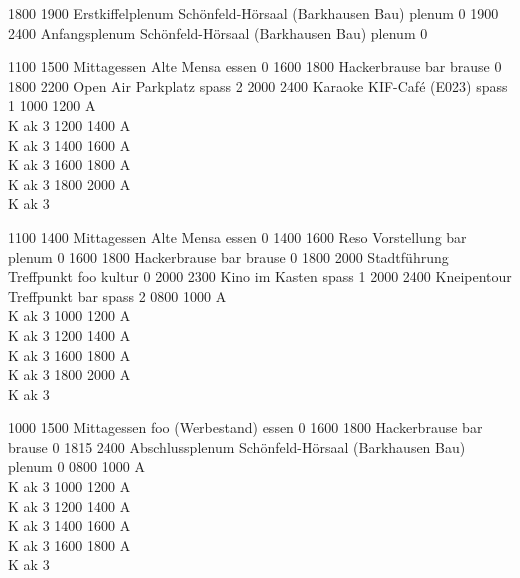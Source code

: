 \documentclass[a5paper,9pt]{scrreprt}
\begin{document}
\begin{timetable}
   {1800} {1900} {Erstkiffelplenum} {Schönfeld-Hörsaal (Barkhausen Bau)} {} {plenum}  {0}
   {1900} {2400} {Anfangsplenum}    {Schönfeld-Hörsaal (Barkhausen Bau)} {} {plenum}  {0}

   {1100} {1500} {Mittagessen}      {Alte Mensa}       {} {essen}   {0}
   {1600} {1800} {Hackerbrause}     {bar}              {} {brause}  {0}
   {1800} {2200} {Open Air}         {Parkplatz}        {} {spass}   {2}
   {2000} {2400} {Karaoke}          {KIF-Café (E023)}  {} {spass}   {1}
   {1000} {1200} {\hfill A\\ \hfill K} {}              {} {ak}      {3}
   {1200} {1400} {\hfill A\\ \hfill K} {}              {} {ak}      {3}
   {1400} {1600} {\hfill A\\ \hfill K} {}              {} {ak}      {3}
   {1600} {1800} {\hfill A\\ \hfill K} {}              {} {ak}      {3}
   {1800} {2000} {\hfill A\\ \hfill K} {}              {} {ak}      {3}
  
   {1100} {1400} {Mittagessen}      {Alte Mensa}       {} {essen}   {0}
   {1400} {1600} {Reso Vorstellung} {bar}              {} {plenum}  {0}
   {1600} {1800} {Hackerbrause}     {bar}              {} {brause}  {0}
   {1800} {2000} {Stadtführung}     {Treffpunkt foo}   {} {kultur}  {0}
   {2000} {2300} {Kino}             {im Kasten}        {} {spass}   {1}
   {2000} {2400} {Kneipentour}      {Treffpunkt bar}   {} {spass}   {2}
   {0800} {1000} {\hfill A\\ \hfill K} {}              {} {ak}      {3}
   {1000} {1200} {\hfill A\\ \hfill K} {}              {} {ak}      {3}
   {1200} {1400} {\hfill A\\ \hfill K} {}              {} {ak}      {3}
   {1600} {1800} {\hfill A\\ \hfill K} {}              {} {ak}      {3}
   {1800} {2000} {\hfill A\\ \hfill K} {}              {} {ak}      {3}

   {1000} {1500} {Mittagessen}      {foo (Werbestand)} {} {essen}   {0}
   {1600} {1800} {Hackerbrause}     {bar}              {} {brause}  {0}
   {1815} {2400} {Abschlussplenum}  {Schönfeld-Hörsaal (Barkhausen Bau)} {} {plenum}  {0}
   {0800} {1000} {\hfill A\\ \hfill K} {}              {} {ak}      {3}
   {1000} {1200} {\hfill A\\ \hfill K} {}              {} {ak}      {3}
   {1200} {1400} {\hfill A\\ \hfill K} {}              {} {ak}      {3}
   {1400} {1600} {\hfill A\\ \hfill K} {}              {} {ak}      {3}
   {1600} {1800} {\hfill A\\ \hfill K} {}              {} {ak}      {3}
\end{timetable}
\end{document}
